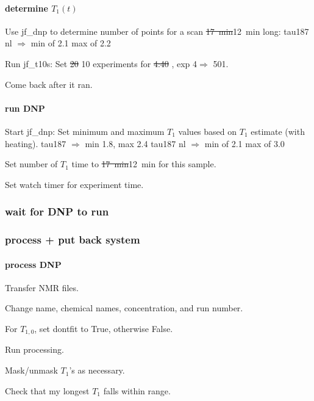 \paragraph{determine $T_1(t)$}
Use jf\_dnp to determine number of points for a scan \sout{17~min}12~min long:
tau187 nl $\Rightarrow$ min of 2.1 max of 2.2

Run jf\_t10s:
Set \sout{ 20 }10 experiments for \sout{ 4:40 }, exp 4$\Rightarrow$ 501.

Come back after it ran.

\paragraph{run DNP}
Start jf\_dnp: Set minimum and maximum $T_1$ values based on $T_1$ estimate (with heating).
tau187 $\Rightarrow$ min 1.8, max 2.4
tau187 nl $\Rightarrow$ min of 2.1 max of 3.0

Set number of $T_1$ time to \sout{17~min}12~min for this sample.

Set watch timer for experiment time.

\subsubsection{wait for DNP to run}

\subsubsection{process + put back system}
\paragraph{process DNP}
Transfer NMR files.

Change name, chemical names, concentration, and run number.

For $T_{1,0}$, set dontfit to True, otherwise False.

Run processing.

Mask/unmask $T_1$'s as necessary.

Check that my longest $T_1$ falls within range.


